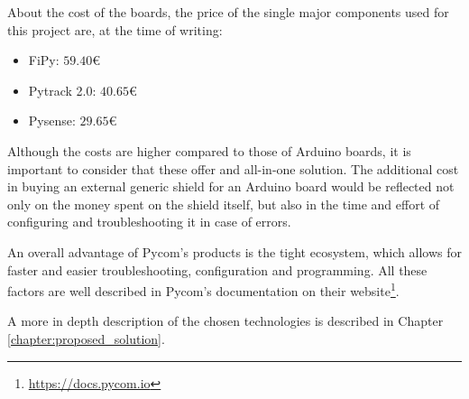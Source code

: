 			About the cost of the boards, the price of the single major components used for this project are, at the time of writing:
			\begin{itemize}
				\item FiPy: $59.40$€
				\item Pytrack 2.0: $40.65$€
				\item Pysense: $29.65$€
			\end{itemize}
			
			Although the costs are higher compared to those of Arduino boards, it is important to consider that these offer and all-in-one solution.
			The additional cost in buying an external generic shield for an Arduino board would be reflected not only on the money spent on the shield itself, but also in the time and effort of configuring and troubleshooting it in case of errors.
			
			An overall advantage of Pycom's products is the tight ecosystem, which allows for faster and easier troubleshooting, configuration and programming.
			All these factors are well described in Pycom's documentation on their website\footnote{ \url{https://docs.pycom.io}}.
			
			A more in depth description of the chosen technologies is described in Chapter \ref{chapter:proposed_solution}.